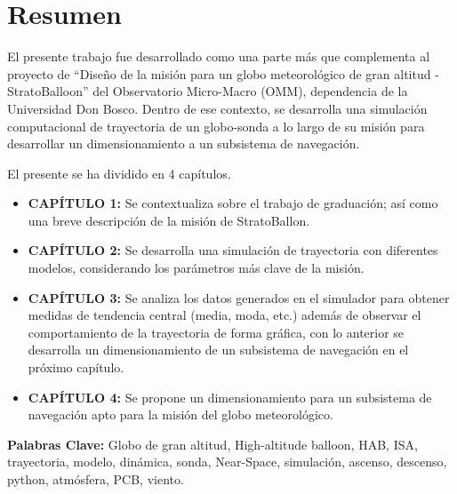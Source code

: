 \chapter*{Resumen} \label{chp:00_abstract}

El presente trabajo fue desarrollado como una parte más que complementa al proyecto de “Diseño de la misión para un globo meteorológico de gran altitud - StratoBalloon” del Observatorio Micro-Macro (OMM), dependencia de la Universidad Don Bosco. Dentro de ese contexto, se desarrolla una simulación computacional de trayectoria de un globo-sonda a lo largo de su misión para desarrollar un dimensionamiento a un subsistema de navegación.  

\vspace{0.4cm}

El presente se ha dividido en 4 capítulos.

\begin{itemize}
    \item \textbf{CAPÍTULO 1:} Se contextualiza sobre el trabajo de graduación; así como una breve descripción de la misión de StratoBallon.
    \item \textbf{CAPÍTULO 2:} Se desarrolla una simulación de trayectoria con diferentes modelos,  considerando los parámetros más clave de la misión. 
    \item \textbf{CAPÍTULO 3:} Se analiza los datos generados en el simulador para obtener medidas de tendencia central (media, moda, etc.) además de observar el comportamiento de la trayectoria de forma gráfica, con lo anterior se desarrolla un dimensionamiento de un subsistema de navegación en el próximo capítulo. 
    \item \textbf{CAPÍTULO 4:} Se propone un dimensionamiento para un subsistema de navegación apto para la misión del globo meteorológico.

\end{itemize}

\vspace{1.0cm}

\textbf{Palabras Clave:}  Globo de gran altitud, High-altitude balloon, HAB, ISA, trayectoria, modelo, dinámica, sonda, Near-Space, simulación, ascenso, descenso, python, atmósfera, PCB, viento.



\newpage


